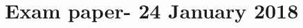 \documentclass[\main/main.tex]{subfiles}
\begin{document}
\section{Exam paper- 24 January 2018}


\clearpage

\clearpage

\clearpage

\clearpage

\clearpage

\clearpage

\clearpage

\end{document}
